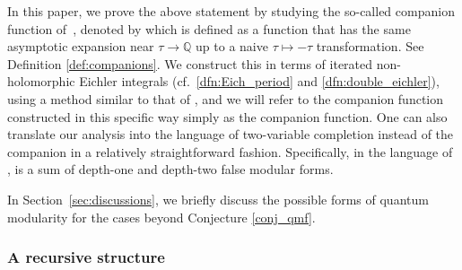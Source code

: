 \documentclass[10pt,a4paper]{amsart}
\def\Zh{\widehat{Z}}
\newcommand{\QQ}{\mathbb{Q}}
\theoremstyle{definition}
\numberwithin{equation}{section}
\begin{document}
In this paper, we prove the above statement by studying the so-called companion function of~\smash{$\Zh^G_{\vec{\underline{b}}}$}, denoted by  which is defined as a function that has the same asymptotic expansion near $\tau\to \QQ$ up to a naive $\tau\mapsto -\tau$ transformation. See Definition \ref{def:companions}. We construct this in terms of iterated non-holomorphic Eichler integrals (cf.\ \eqref{dfn:Eich_period} and \eqref{dfn:double_eichler}), using a method similar to that of \cite{bringmann2018higher}, and we will refer to the companion function constructed in this specific way simply as the companion function. One can also translate our analysis into the language of two-variable completion \cite{Bringmann:2021dxg} instead of the companion in a relatively straightforward fashion. Specifically, in the language of \cite{Bringmann:2021dxg}, \smash{$\Zh^G_{\vec{\underline{b}}}$} is a sum of depth-one and depth-two false modular forms.

In Section~\ref{sec:discussions}, we briefly discuss the possible forms of quantum modularity for the cases beyond Conjecture \ref{conj_qmf}.

\subsubsection*{A recursive structure}
\end{document}
